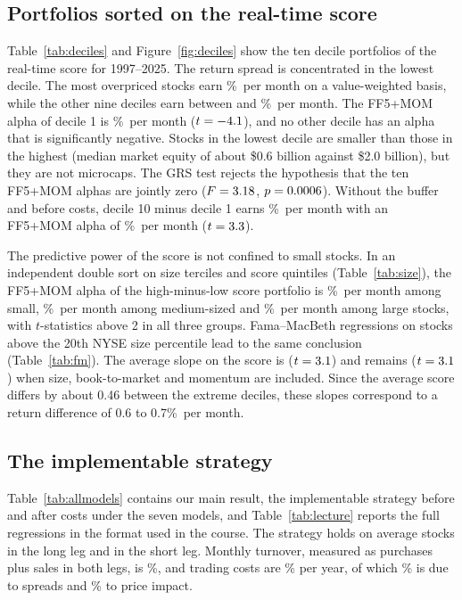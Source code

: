 \documentclass[12pt,a4paper]{article}
\newcommand{\pmo}{\%~per month}
\begin{document}
\subsection{Portfolios sorted on the real-time score}
Table~\ref{tab:deciles} and Figure~\ref{fig:deciles} show the ten decile portfolios of the real-time score for 1997--2025. The return spread is concentrated in the lowest decile. The most overpriced stocks earn \donevw\pmo{} on a value-weighted basis, while the other nine deciles earn between \dresmin{} and \dresmax\pmo. The FF5+MOM alpha of decile 1 is \donea\pmo{} ($t=-4.1$), and no other decile has an alpha that is significantly negative. Stocks in the lowest decile are smaller than those in the highest (median market equity of about \$0.6 billion against \$2.0 billion), but they are not microcaps. The GRS test rejects the hypothesis that the ten FF5+MOM alphas are jointly zero ($F=3.18$, $p=0.0006$). Without the buffer and before costs, decile 10 minus decile 1 earns \decvwmean\pmo{} with an FF5+MOM alpha of \decvwa\pmo{} ($t=3.3$).

The predictive power of the score is not confined to small stocks. In an independent double sort on size terciles and score quintiles (Table~\ref{tab:size}), the FF5+MOM alpha of the high-minus-low score portfolio is \sizesmalla\pmo{} among small, \sizemida\pmo{} among medium-sized and \sizelargea\pmo{} among large stocks, with $t$-statistics above 2 in all three groups. Fama--MacBeth regressions on stocks above the 20th NYSE size percentile lead to the same conclusion (Table~\ref{tab:fm}). The average slope on the score is \fmscoreone{} ($t=3.1$) and remains \fmscore{} ($t=3.1$) when size, book-to-market and momentum are included. Since the average score differs by about 0.46 between the extreme deciles, these slopes correspond to a return difference of 0.6 to 0.7\pmo.

\subsection{The implementable strategy}
Table~\ref{tab:allmodels} contains our main result, the implementable strategy before and after costs under the seven models, and Table~\ref{tab:lecture} reports the full regressions in the format used in the course. The strategy holds on average \nL{} stocks in the long leg and \nS{} in the short leg. Monthly turnover, measured as purchases plus sales in both legs, is \turnfull\%, and trading costs are \costfull\% per year, of which \costspread\% is due to spreads and \costimpact\% to price impact.
\end{document}
